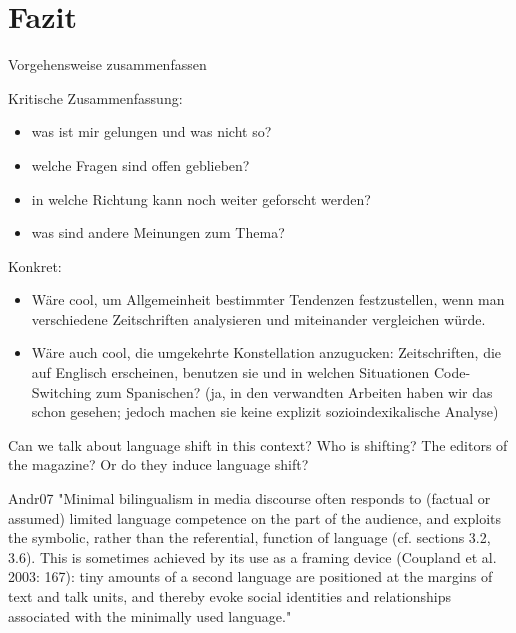 \section{Fazit}
\label{chap:conclusion}

\begin{comment}
    * Einleitung und Fazit müssen zusammenpassen.
    * sind die Erkenntnisse im Fazit aus der Arbeit ableitbar?
    * Vorgehensweise zusammenfassen

\end{comment}

Vorgehensweise zusammenfassen

Kritische Zusammenfassung:
\begin{itemize}
    \item was ist mir gelungen und was nicht so?
    \item welche Fragen sind offen geblieben?
    \item in welche Richtung kann noch weiter geforscht werden?
    \item was sind andere Meinungen zum Thema?
\end{itemize}

Konkret:
\begin{itemize}
   \item Wäre cool, um Allgemeinheit bestimmter Tendenzen festzustellen, wenn man verschiedene Zeitschriften analysieren und miteinander vergleichen würde.
   \item Wäre auch cool, die umgekehrte Konstellation anzugucken: Zeitschriften, die auf Englisch erscheinen, benutzen sie und in welchen Situationen Code-Switching zum Spanischen? (ja, in den verwandten Arbeiten haben wir das schon gesehen; jedoch machen sie keine explizit sozioindexikalische Analyse)
\end{itemize}

Can we talk about language shift in this context?
Who is shifting? The editors of the magazine? Or do they induce language shift?


{Andr07}
"Minimal bilingualism
in media discourse often responds to (factual or assumed) limited language
competence on the part of the audience, and exploits the symbolic, rather
than the referential, function of language (cf. sections 3.2, 3.6). This is
sometimes achieved by its use as a framing device (Coupland et al. 2003:
167): tiny amounts of a second language are positioned at the margins of
text and talk units, and thereby evoke social identities and relationships
associated with the minimally used language."


